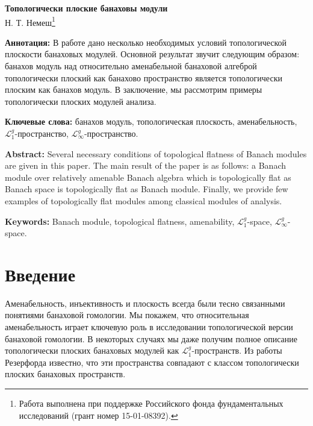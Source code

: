 \documentclass[12pt]{article}
\begin{document}
\begin{center}
\Large \textbf{Топологически плоские банаховы модули}\\[0.5cm]
\small {Н. Т. Немеш}\footnote{Работа выполнена при поддержке Российского фонда фундаментальных исследований (грант номер 15-01-08392).}\\[0.5cm]
\end{center}

\thispagestyle{empty}

\medskip
\textbf{Аннотация:} В работе дано несколько необходимых условий топологической плоскости банаховых модулей. Основной результат звучит следующим образом: банахов модуль над относительно аменабельной банаховой алгеброй топологически плоский как банахово пространство является топологически плоским как банахов модуль. В заключение, мы рассмотрим примеры топологически плоских модулей анализа.

\medskip
\textbf{Ключевые слова:} банахов модуль, топологическая плоскость, аменабельность, $\mathcal{L}_1^g$-пространство, $\mathcal{L}_\infty^g$-пространство.

\textbf{Abstract:} Several necessary conditions of topological flatness of Banach modules are given in this paper. The main result of the paper is as follows: a Banach module over relatively amenable Banach algebra which is topologically flat as Banach space is topologically flat as Banach module. Finally, we provide few examples of topologically flat modules among classical modules of analysis.

\medskip
\textbf{Keywords:} Banach module, topological flatness, amenability, $\mathcal{L}_1^g$-space, $\mathcal{L}_\infty^g$-space.

\bigskip


\section{Введение}
\label{SectionIntroduction}

Аменабельность, инъективность и плоскость всегда были тесно связанными понятиями банаховой гомологии. Мы покажем, что относительная аменабельность играет ключевую роль в исследовании топологической версии банаховой гомологии. В некоторых случаях мы даже получим полное описание топологически плоских банаховых модулей как $\mathcal{L}_1^g$-пространств. Из работы Резерфорда \cite{StegRethNucOpL1LInfSp} известно, что эти пространства совпадают с классом топологически плоских банаховых пространств. 
\end{document}
